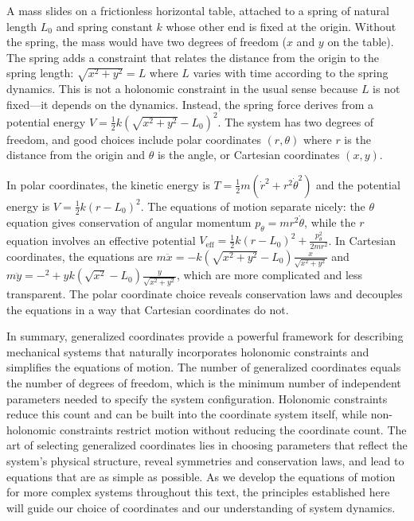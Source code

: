 A mass slides on a frictionless horizontal table, attached to a spring of natural length $L_0$ and spring constant $k$ whose other end is fixed at the origin. Without the spring, the mass would have two degrees of freedom ($x$ and $y$ on the table). The spring adds a constraint that relates the distance from the origin to the spring length: $\sqrt{x^2 + y^2} = L$ where $L$ varies with time according to the spring dynamics. This is not a holonomic constraint in the usual sense because $L$ is not fixed—it depends on the dynamics. Instead, the spring force derives from a potential energy $V = \frac{1}{2}k(\sqrt{x^2 + y^2} - L_0)^2$. The system has two degrees of freedom, and good choices include polar coordinates $(r, \theta)$ where $r$ is the distance from the origin and $\theta$ is the angle, or Cartesian coordinates $(x, y)$.

In polar coordinates, the kinetic energy is $T = \frac{1}{2}m(\dot{r}^2 + r^2\dot{\theta}^2)$ and the potential energy is $V = \frac{1}{2}k(r - L_0)^2$. The equations of motion separate nicely: the $\theta$ equation gives conservation of angular momentum $p_\theta = mr^2\dot{\theta}$, while the $r$ equation involves an effective potential $V_{\text{eff}} = \frac{1}{2}k(r - L_0)^2 + \frac{p_\theta^2}{2mr^2}$. In Cartesian coordinates, the equations are $m\ddot{x} = -k(\sqrt{x^2 + y^2} - L_0)\frac{x}{\sqrt{x^2 + y^2}}$ and $m\ddot{y} = -^2 + yk(\sqrt{x^2} - L_0)\frac{y}{\sqrt{x^2 + y^2}}$, which are more complicated and less transparent. The polar coordinate choice reveals conservation laws and decouples the equations in a way that Cartesian coordinates do not.

In summary, generalized coordinates provide a powerful framework for describing mechanical systems that naturally incorporates holonomic constraints and simplifies the equations of motion. The number of generalized coordinates equals the number of degrees of freedom, which is the minimum number of independent parameters needed to specify the system configuration. Holonomic constraints reduce this count and can be built into the coordinate system itself, while non-holonomic constraints restrict motion without reducing the coordinate count. The art of selecting generalized coordinates lies in choosing parameters that reflect the system's physical structure, reveal symmetries and conservation laws, and lead to equations that are as simple as possible. As we develop the equations of motion for more complex systems throughout this text, the principles established here will guide our choice of coordinates and our understanding of system dynamics.
